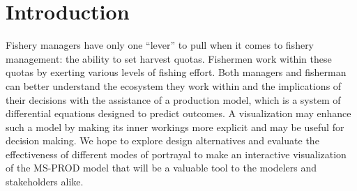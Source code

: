 %
\chapter{Introduction}                %

Fishery managers have only one ``lever'' to pull when it comes to fishery management: the ability to set harvest quotas.  Fishermen work within these quotas by exerting various levels of fishing effort.  Both managers and fisherman can better understand the ecosystem they work within and the implications of their decisions with the assistance of a production model, which is a system of differential equations designed to predict outcomes.  A visualization may enhance such a model by making its inner workings more explicit and may be useful for decision making. We hope to explore design alternatives and evaluate the effectiveness of different modes of portrayal to make an interactive visualization of the MS-PROD model that will be a valuable tool to the modelers and stakeholders alike. 
